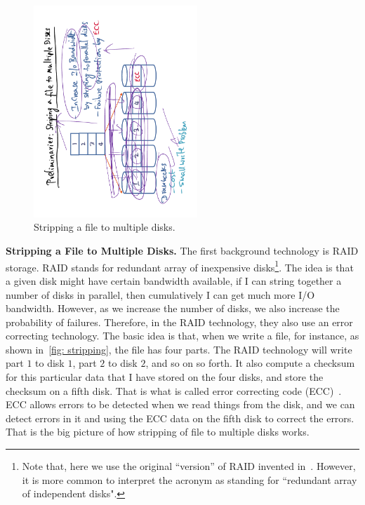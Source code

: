 \documentclass[11pt]{lecture}
\def\fullsize{0.55\textwidth}
\begin{document}
\begin{figure}
\centering
\includegraphics[width=\fullsize, angle=-90]{Figures/striping-file}
\caption{Stripping a file to multiple disks.}\label{fig: stripping}
\end{figure}
\noindent
{\bf Stripping a File to Multiple Disks.} The first background technology is RAID storage. 
RAID stands for redundant array of inexpensive disks\footnote{Note that, here we use the 
original ``version'' of RAID invented in~\cite{Patterson1998RAID}. However, it is more 
common to interpret the acronym as standing for ``redundant array of independent disks". }. 
The idea is that a given disk might have certain bandwidth available, if I can string together a number of 
disks in parallel, then cumulatively I can get much more I/O bandwidth. However, as we increase 
the number of disks, we also increase the probability of failures. Therefore, in the RAID 
technology, they also use an error correcting technology. The basic idea is that, when we write a file, 
for instance, as shown in~\autoref{fig: stripping}, the file has four parts. The RAID technology will write 
part $1$ to disk $1$, part $2$ to disk $2$, and so on so forth. It also compute a checksum for this 
particular data that I have stored on the four disks, and store the checksum on a fifth disk. 
That is what is called error correcting code (ECC)~\cite{lin2004ecc}. ECC allows errors to be detected when 
we read things from the disk, and we can detect errors in it and using the ECC data on the fifth 
disk to correct the errors. That is the big picture of how stripping of file to multiple disks works. 
\end{document}
